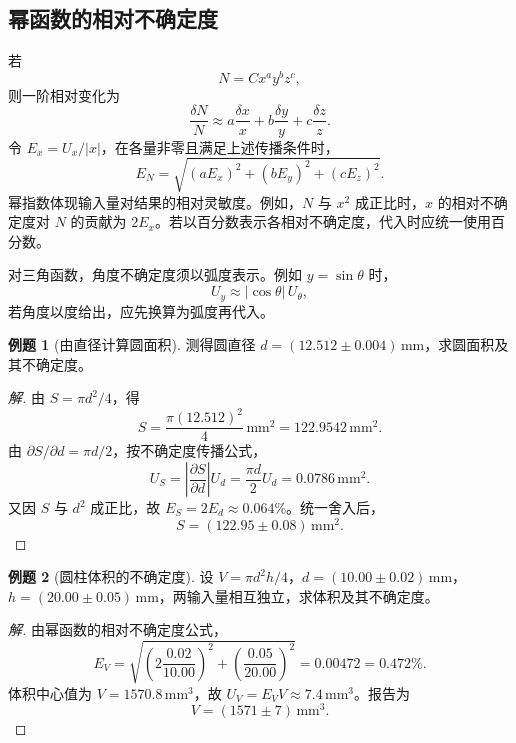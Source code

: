 \documentclass[UTF8, fontset=fandol, a4paper, 12pt]{ctexart}
\theoremstyle{definition}
\newtheorem{example}{例题}[section]
\newcommand{\abs}[1]{\left|#1\right|}
\begin{document}
\subsection*{幂函数的相对不确定度}

若
\[
  N=Cx^a y^b z^c,
\]
则一阶相对变化为
\[
  \frac{\delta N}{N}\approx
  a\frac{\delta x}{x}+b\frac{\delta y}{y}+c\frac{\delta z}{z}.
\]
令 $E_x=U_x/\abs{x}$，在各量非零且满足上述传播条件时，
\[
  E_N=\sqrt{(aE_x)^2+(bE_y)^2+(cE_z)^2}.
\]
幂指数体现输入量对结果的相对灵敏度。例如，$N$ 与 $x^2$ 成正比时，$x$ 的相对不确定度对 $N$ 的贡献为 $2E_x$。若以百分数表示各相对不确定度，代入时应统一使用百分数。

对三角函数，角度不确定度须以弧度表示。例如 $y=\sin\theta$ 时，
\[
  U_y\approx\abs{\cos\theta}\,U_\theta,
\]
若角度以度给出，应先换算为弧度再代入。

\begin{example}[由直径计算圆面积]
测得圆直径 $d=(12.512\pm0.004)\,\mathrm{mm}$，求圆面积及其不确定度。
\end{example}

\begin{proof}[解]
由 $S=\pi d^2/4$，得
\[
  S=\frac{\pi(12.512)^2}{4}\,\mathrm{mm}^2
   =122.9542\,\mathrm{mm}^2.
\]
由 $\partial S/\partial d=\pi d/2$，按不确定度传播公式，
\[
  U_S=\abs{\frac{\partial S}{\partial d}}U_d
  =\frac{\pi d}{2}U_d
  =0.0786\,\mathrm{mm}^2.
\]
又因 $S$ 与 $d^2$ 成正比，故 $E_S=2E_d\approx0.064\%$。统一舍入后，
\[
  \boxed{S=(122.95\pm0.08)\,\mathrm{mm}^2}.
\]
\end{proof}

\begin{example}[圆柱体积的不确定度]
设 $V=\pi d^2h/4$，$d=(10.00\pm0.02)\,\mathrm{mm}$，$h=(20.00\pm0.05)\,\mathrm{mm}$，两输入量相互独立，求体积及其不确定度。
\end{example}

\begin{proof}[解]
由幂函数的相对不确定度公式，
\[
  E_V=\sqrt{\left(2\frac{0.02}{10.00}\right)^2+
                   \left(\frac{0.05}{20.00}\right)^2}
      =0.00472=0.472\%.
\]
体积中心值为 $V=1570.8\,\mathrm{mm}^3$，故 $U_V=E_VV\approx7.4\,\mathrm{mm}^3$。报告为
\[
  \boxed{V=(1571\pm7)\,\mathrm{mm}^3}.
\]
\end{proof}
\end{document}
